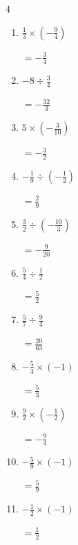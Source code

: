 \begin{multicols}{4}
\begin{enumerate}
        $\displaystyle =\frac{1}{2}$

  \item $\displaystyle \frac{1}{3}\times{}\left(-\frac{9}{4}\right)$

        $\displaystyle =-\frac{3}{4}$

\columnbreak %

  \item $\displaystyle -8\div{}\frac{3}{4}$

        $\displaystyle =-\frac{32}{3}$

  \item $\displaystyle 5\times{}\left(-\frac{3}{10}\right)$

        $\displaystyle =-\frac{3}{2}$

  \item $\displaystyle -\frac{1}{9}\div{}\left(-\frac{1}{2}\right)$

        $\displaystyle =\frac{2}{9}$

  \item $\displaystyle \frac{3}{2}\div{}\left(-\frac{10}{3}\right)$

        $\displaystyle =-\frac{9}{20}$

  \item $\displaystyle \frac{5}{4}\div{}\frac{1}{2}$

        $\displaystyle =\frac{5}{2}$

  \item $\displaystyle \frac{5}{7}\div{}\frac{9}{4}$

        $\displaystyle =\frac{20}{63}$

  \item $\displaystyle -\frac{5}{3}\times{}\left(-1\right)$

        $\displaystyle =\frac{5}{3}$

  \item $\displaystyle \frac{9}{2}\times{}\left(-\frac{1}{2}\right)$

        $\displaystyle =-\frac{9}{4}$

  \item $\displaystyle -\frac{5}{9}\times{}\left(-1\right)$

        $\displaystyle =\frac{5}{9}$

  \item $\displaystyle -\frac{1}{2}\times{}\left(-1\right)$

        $\displaystyle =\frac{1}{2}$

\columnbreak %


\end{enumerate}
\end{multicols}
